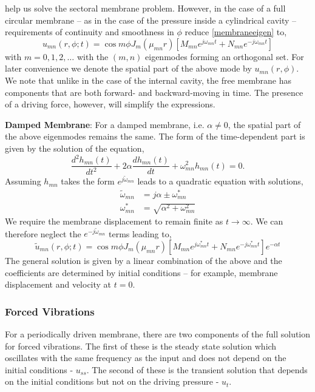 help us solve the sectoral membrane problem. However, in the case of a full circular membrane -- as in the case
of the pressure inside a cylindrical cavity -- requirements of continuity and smoothness in $\phi$ reduce \eqref{membraneeigen}
to,
\begin{equation}\label{circularmembraneeigen}
 u_{mn}(r,\phi;t)=\cos m\phi J_m(\mu_{mn} r)\left[M_{mn}e^{j\omega_{mn} t}+N_{mn}e^{-j\omega_{mn} t}\right]
\end{equation}
with $m=0,1,2,\ldots$ with the $(m,n)$ eigenmodes forming an orthogonal set. For later convenience we denote the spatial
part of the above mode by $u_{mn}(r,\phi)$. We note that unlike in the case of the internal cavity, the free membrane has components
that are both forward- and backward-moving in time. The presence of a driving force, however, will simplify the expressions.

\vspace{\baselineskip}
\noindent\textbf{Damped Membrane}: For a damped membrane, i.e. $\alpha\neq 0$, the spatial part of the above eigenmodes remains the same. The form of the
time-dependent part is given by the solution of the equation,
\begin{equation}\label{dampedtimepart}
 \frac{d^2 h_{mn}(t)}{dt^2}+2\alpha \frac{d h_{mn}(t)}{dt}+\omega_{mn}^2h_{mn}(t)=0.
\end{equation}
Assuming $h_{mn}$ takes the form $e^{j\widetilde{\omega}_{mn}}$ leads to a quadratic equation with solutions,
\begin{align}
 \widetilde{\omega}_{mn}&=j\alpha\pm\omega_{mn}^*\\
 \omega_{mn}^*&=\sqrt{\alpha^2+\omega^2_{mn}}
\end{align}
We require the membrane displacement to remain finite as $t\rightarrow\infty$. We can therefore neglect the $e^{-j\widetilde{\omega}_{mn}}$ terms leading
to,
\begin{equation}\label{circularmembranedampedeigen}
 \widetilde{u}_{mn}(r,\phi;t)=\cos m\phi J_m(\mu_{mn} r)\left[M_{mn}e^{j\omega_{mn}^* t}+N_{mn}e^{-j\omega_{mn}^* t}\right]e^{-\alpha t}
\end{equation}
The general solution is given by a linear combination of the above and the coefficients are determined by initial conditions -- for example,
membrane displacement and velocity at $t=0$.
\subsubsection*{Forced Vibrations}
For a periodically driven membrane, there are two components of the full solution for forced vibrations. The first of these is the steady state solution which
oscillates with the same frequency as the input and does not depend on the initial conditions - $u_{ss}$. The second of these is the transient solution that depends
on the initial conditions but not on the driving pressure - $u_t$. 

